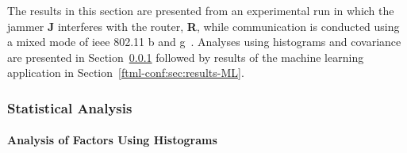 The results in this section are  presented from an experimental run in which the jammer \textbf{J} interferes with the router, \textbf{R}, while communication is conducted using a mixed mode of \gls{ieee} 802.11 b and g~\cite{IEEE802.11ac}.  Analyses using histograms and covariance are presented in Section~\ref{ftml-conf:sec:results:stats} followed by results of the machine learning application in Section~\ref{ftml-conf:sec:results-ML}.

\subsubsection{Statistical Analysis}\label{ftml-conf:sec:results:stats}
\paragraph{Analysis of Factors Using Histograms}


